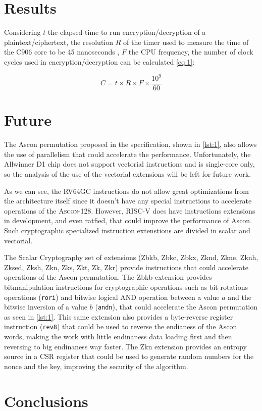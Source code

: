 \documentclass[11pt,twoside]{article}
\begin{document}
\section{Results}

Considering $t$ the elapsed time to run encryption/decryption of a plaintext/ciphertext, the resolution $R$ of the timer used to measure the time of the C906 core to be 45 nanoseconds  \cite{10179399}, $F$ the CPU frequency, the number of clock cycles used in encryption/decryption can be calculated \cref{eq:1}:

\begin{equation}
  C = t \times R \times F \times \frac{10^{9}}{60} \label{eq:1}
\end{equation}

\section{Future}

The Ascon permutation proposed in the specification, shown in \cref{lst:1}, also allows the use of parallelism that could accelerate the performance. Unfortunately, the Allwinner D1 chip does not support vectorial instructions and is single-core only, so the analysis of the use of the vectorial extensions will be left for future work.

As we can see, the RV64GC instructions do not allow great optimizations from the architecture itself since it doesn't have any special instructions to accelerate operations of the \textsc{Ascon-128}. However, RISC-V does have instructions extensions in development, and even ratfied, that could improve the performance of Ascon. Such cryptographic specialized instruction extenstions are divided in scalar and vectorial.

The Scalar Cryptography set of extensions (Zbkb, Zbkc, Zbkx, Zknd, Zkne, Zknh, Zksed, Zksh, Zkn, Zks, Zkt, Zk, Zkr) \cite{riscvCryptoVol1} provide instructions that could accelerate operations of the Ascon permutation. The Zbkb extension provides bitmanipulation instructions for cryptographic operations such as bit rotations operations (\texttt{rori}) and bitwise logical AND operation between a value $a$ and the bitwise inversion of a value $b$ (\texttt{andn}), that could accelerate the Ascon permutation as seen in \cref{lst:1}. This same extension also provides a byte-reverse register instruction (\texttt{rev8}) that could be used to reverse the endianess of the Ascon words, making the work with little endinaness data loading first and then reversing to big endinaness way faster. The Zkn extension provides an entropy source in a CSR register that could be used to generate random numbers for the nonce and the key, improving the security of the algorithm.


\section{Conclusions}

\printbibliography
\end{document}
